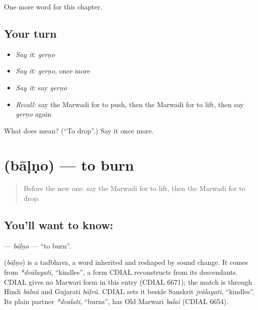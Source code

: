 \begin{grammarlens}[title={What you've built}]
One more word for this chapter.
\end{grammarlens}

\subsection*{Your turn}
\begin{itemize}
\raggedright
  \item \emph{Say it:} \emph{gerṇo}
  \item \emph{Say it:} \emph{gerṇo}, once more
  \item \emph{Say it:} say \emph{gerṇo}
  \item \emph{Recall:} say the Marwadi for to push, then the Marwadi for to lift, then say \emph{gerṇo} again
\end{itemize}

\begin{tcolorbox}[breakable,colback=teal!4,colframe=teal!35!black,title={Before you move on}]
What does  mean? (\textquotedblleft{}To drop\textquotedblright{}.) Say it once more.
\end{tcolorbox}
\section[\texorpdfstring{\mw{बाळणो} (bāḷṇo)}{बाळणो (bāḷṇo)}]{ (bāḷṇo) — to burn}

\label{lesson:MW-C106-balno}



\begin{quote}
Before the new one: say the Marwadi for to lift, then the Marwadi for to drop.
\end{quote}

\subsection*{You'll want to know: }
\textbf{} — \emph{bāḷṇo} — \textquotedblleft{}to burn\textquotedblright{}.

\begin{cousinweb}
\textbf{} (\emph{bāḷṇo}) is a tadbhava, a word inherited and reshaped by sound change. It comes from \emph{*dvālayati}, \textquotedblleft{}kindles\textquotedblright{}, a form CDIAL reconstructs from its descendants. CDIAL gives no Marwari form in this entry (CDIAL 6671); the match is through Hindi \emph{bālnā} and Gujarati \emph{bāḷvũ}. CDIAL sets it beside Sanskrit \emph{jvālayati}, \textquotedblleft{}kindles\textquotedblright{}. Its plain partner \emph{*dvalati}, \textquotedblleft{}burns\textquotedblright{}, has Old Marwari \emph{balaï} (CDIAL 6654).
\end{cousinweb}

